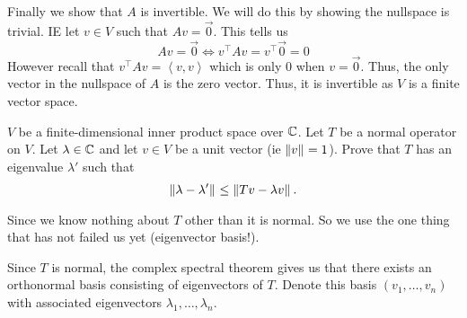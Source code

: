 \documentclass[answers]{exam}
\newcommand{\ip}[1]{\left\langle#1\right\rangle}
\begin{document}
\begin{questions}
\begin{parts}
\begin{solution}
            Finally we show that $A$ is invertible. We will do this by showing the nullspace
            is trivial. IE let $v\in V$ such that $Av = \vec{0}$. This tells us
            \[
                Av = \vec{0} \iff v^\top Av = v^\top\vec{0} = 0
            \]
            However recall that $v^\top Av = \ip{v,v}$ which is only $0$ when $v = \vec{0}$. Thus, the only
            vector in the nullspace of $A$ is the zero vector. Thus, it is invertible as $V$ is a finite vector
            space.

        \end{solution}
    \end{parts}
    \question $V$ be a finite-dimensional inner product space over $\mathbb{C}$. Let $T$ be a normal operator
    on $V$. Let $\lambda\in\mathbb{C}$ and let $v\in V$ be a unit vector (ie $\left\|v\right\|_{} = 1$). Prove that $T$ has an
    eigenvalue $\lambda'$ such that 
    \[
        \left\|\lambda - \lambda'\right\|_{} \leq \left\|Tv - \lambda v\right\|_{}.
    \]
    \begin{solution}
        
         Since we know nothing about $T$ other than it is normal. So we use the one thing
        that has not failed us yet (eigenvector basis!). 


        Since $T$ is normal, the complex spectral theorem
        gives us that there exists an orthonormal basis consisting of eigenvectors of $T$. Denote this basis
        $(v_1,\dots,v_n)$ with associated eigenvectors $\lambda_1,\dots,\lambda_n$.


\end{solution}
\end{questions}
\end{document}
